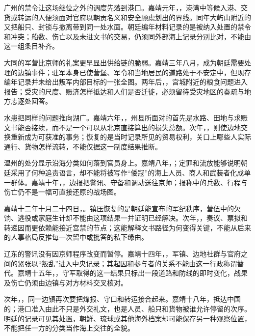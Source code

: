 广州的禁令让这场继位之外的调度先落到港口。嘉靖元年，，港湾中等候入港、交货或转运的人便须面对官府以朝贡名义和安全顾虑划出的界线。同年大屿山附近的又把船只、封锁与撤离带到同一处水面。朝廷编年材料记录的是被纳入处置的禁令和冲突；船数、伤亡以及未进文书的交易，仍须同外部海上记录分别比对，不能由这一组条目补齐。

大同的军营比京师的礼案更早显出供给链的脆弱。嘉靖三年八月，成为朝廷需要处理的边镇事件；驻军本身已使营堡、军令和当地居民的道路处于不安定中，但现存编年记录并未给出叛军内部目标的一张全图。两年后，，宫城附近的粮食问题进入报告；受灾的尺度、赈济怎样抵达和人们是否迁徙，必须留待受灾地区的奏疏与地方志逐处回答。

水患把同样的问题推向湖广。嘉靖六年，，州县所面对的首先是水路、田地与求赈文书能否接续，而不是一个可以从北京直接算出的损失总额。次年，，则使边地交换重新成为可获准的事务；恢复的是当时记录所见的贸易权利，关口上哪些人实际通行、货物怎样流转，不能仅据这一制度结果推断。

温州的处分显示沿海分类如何落到官员身上。嘉靖八年，；定罪和流放能够说明朝廷采用了何种追责语言，却不能将被写作“倭寇”的海上人员、商人和武装者化成单一群体。嘉靖十年，，边报把警讯、守备和调动送往京师；报称中的兵数、行程与伤亡仍不是一幅可直接还原的战场图。

嘉靖十二年十月二十四日，。镇压恢复的是朝廷能宣布的军纪秩序，营伍中的欠饷、逃役或家庭生计却不能由这项结果一并证明已经解决。次年，，奏议、票拟和转递因而更依赖能接近宫禁的节点；这能解释文书路径为何变得关键，不能从后来的人事格局反推每一次留中或批答的私下缘由。

辽东的警讯没有因京师程序改变而暂停。嘉靖十四年，，军镇、边地社群与官府之间的紧张以“叛乱”进入中央记录；其起因和参与者的关系不能由这一行政称谓替代。嘉靖十五年，，守军取得的这一结果只标出一段道路和防线的即时变化，战果及伤亡仍须由边镇与对方材料交叉核对。

次年，，同一边镇再次要把烽报、守口和转运接合起来。嘉靖十八年，抵达中国的；港口准入由此不只是外交礼文，也是人员、船只和货物被谁允许停留的次序。明廷的记录可见其处置，朝鲜、琉球或其他海外档案却可能保存另一种观察位置，不能把任一方的分类当作海上交往的全貌。

